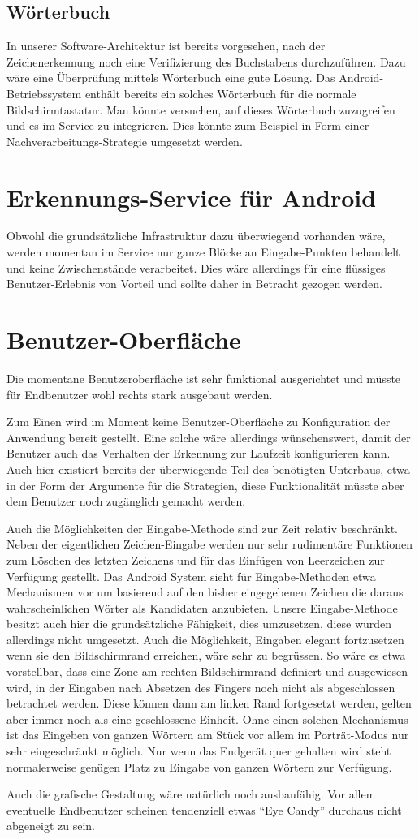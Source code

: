 \subsection{Wörterbuch}
In unserer Software-Architektur ist bereits vorgesehen, nach der Zeichenerkennung noch eine Verifizierung des Buchstabens durchzuführen. Dazu wäre eine Überprüfung mittels Wörterbuch eine gute Lösung. Das Android-Betriebssystem enthält bereits ein solches Wörterbuch für die normale Bildschirmtastatur. Man könnte versuchen, auf dieses Wörterbuch zuzugreifen und es im Service zu integrieren. Dies könnte zum Beispiel in Form einer Nachverarbeitungs-Strategie umgesetzt werden.

\section{Erkennungs-Service für Android}
Obwohl die grundsätzliche Infrastruktur dazu überwiegend vorhanden wäre, werden momentan im Service nur ganze Blöcke an Eingabe-Punkten behandelt und keine Zwischenstände verarbeitet. Dies wäre allerdings für eine flüssiges Benutzer-Erlebnis von Vorteil und sollte daher in Betracht gezogen werden.

\section{Benutzer-Oberfläche}
Die momentane Benutzeroberfläche ist sehr funktional ausgerichtet und müsste für Endbenutzer wohl rechts stark ausgebaut werden.

Zum Einen wird im Moment keine Benutzer-Oberfläche zu Konfiguration der Anwendung bereit gestellt. Eine solche wäre allerdings wünschenswert, damit der Benutzer auch das Verhalten der Erkennung zur Laufzeit konfigurieren kann. Auch hier existiert bereits der überwiegende Teil des benötigten Unterbaus, etwa in der Form der Argumente für die Strategien, diese Funktionalität müsste aber dem Benutzer noch zugänglich gemacht werden.

Auch die Möglichkeiten der Eingabe-Methode sind zur Zeit relativ beschränkt. Neben der eigentlichen Zeichen-Eingabe werden nur sehr rudimentäre Funktionen zum Löschen des letzten Zeichens und für das Einfügen von Leerzeichen zur Verfügung gestellt. Das Android System sieht für Eingabe-Methoden etwa Mechanismen vor um basierend auf den bisher eingegebenen Zeichen die daraus wahrscheinlichen Wörter als Kandidaten anzubieten. Unsere Eingabe-Methode besitzt auch hier die grundsätzliche Fähigkeit, dies umzusetzen, diese wurden allerdings nicht umgesetzt. Auch die Möglichkeit, Eingaben elegant fortzusetzen wenn sie den Bildschirmrand erreichen, wäre sehr zu begrüssen. So wäre es etwa vorstellbar, dass eine Zone am rechten Bildschirmrand definiert und ausgewiesen wird, in der Eingaben nach Absetzen des Fingers noch nicht als abgeschlossen betrachtet werden. Diese können dann am linken Rand fortgesetzt werden, gelten aber immer noch als eine geschlossene Einheit. Ohne einen solchen Mechanismus ist das Eingeben von ganzen Wörtern am Stück vor allem im Porträt-Modus nur sehr eingeschränkt möglich. Nur wenn das Endgerät quer gehalten wird steht normalerweise genügen Platz zu Eingabe von ganzen Wörtern zur Verfügung.

Auch die grafische Gestaltung wäre natürlich noch ausbaufähig. Vor allem eventuelle Endbenutzer scheinen tendenziell etwas ``Eye Candy'' durchaus nicht abgeneigt zu sein.
